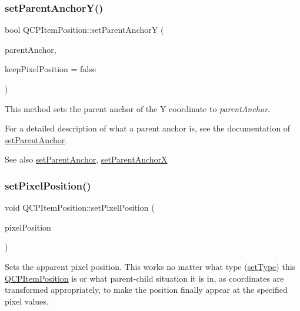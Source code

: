 \subsubsection{\texorpdfstring{set\+Parent\+Anchor\+Y()}{setParentAnchorY()}}
{\footnotesize\ttfamily bool Q\+C\+P\+Item\+Position\+::set\+Parent\+AnchorY (\begin{DoxyParamCaption}\item[{\mbox{\hyperlink{class_q_c_p_item_anchor}{Q\+C\+P\+Item\+Anchor}} $\ast$}]{parent\+Anchor,  }\item[{bool}]{keep\+Pixel\+Position = {\ttfamily false} }\end{DoxyParamCaption})}

This method sets the parent anchor of the Y coordinate to {\itshape parent\+Anchor}.

For a detailed description of what a parent anchor is, see the documentation of \mbox{\hyperlink{class_q_c_p_item_position_ac094d67a95d2dceafa0d50b9db3a7e51}{set\+Parent\+Anchor}}.

\begin{DoxySeeAlso}{See also}
\mbox{\hyperlink{class_q_c_p_item_position_ac094d67a95d2dceafa0d50b9db3a7e51}{set\+Parent\+Anchor}}, \mbox{\hyperlink{class_q_c_p_item_position_add71461a973927c74e42179480916d9c}{set\+Parent\+AnchorX}} 
\end{DoxySeeAlso}
\mbox{\label{class_q_c_p_item_position_a8d4f858f2089973967cf9cb81970ef0a}} 
\subsubsection{\texorpdfstring{set\+Pixel\+Position()}{setPixelPosition()}}
{\footnotesize\ttfamily void Q\+C\+P\+Item\+Position\+::set\+Pixel\+Position (\begin{DoxyParamCaption}\item[{const Q\+PointF \&}]{pixel\+Position }\end{DoxyParamCaption})}

Sets the apparent pixel position. This works no matter what type (\mbox{\hyperlink{class_q_c_p_item_position_aa476abf71ed8fa4c537457ebb1a754ad}{set\+Type}}) this \mbox{\hyperlink{class_q_c_p_item_position}{Q\+C\+P\+Item\+Position}} is or what parent-\/child situation it is in, as coordinates are transformed appropriately, to make the position finally appear at the specified pixel values.

